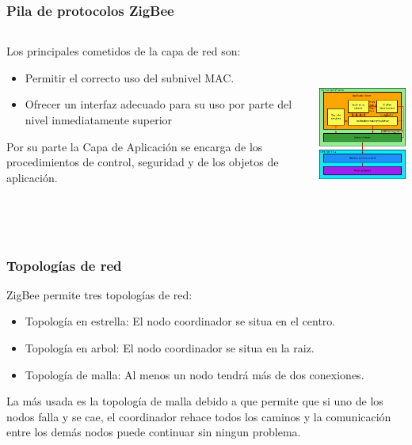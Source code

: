 \documentclass[10pt,a4paper,spanish]{beamer}
\begin{document}
\begin{frame}
	\frametitle{Pila de protocolos ZigBee}
	\begin{columns}
		\begin{column}{6cm}
			Los principales cometidos de la capa de red son:
			\begin{itemize}
				\item Permitir el correcto uso del subnivel MAC.
				\item Ofrecer un interfaz adecuado para su uso por parte del nivel inmediatamente superior
			\end{itemize}

			\vspace{0.5cm}
			Por su parte la Capa de Aplicación se encarga de los procedimientos de control, seguridad y de los objetos de aplicación.
		\end{column}
		\begin{column}{6cm}
			\begin{center}
				\includegraphics[height=6cm]{imagenes/2.png}
			\end{center}
		\end{column}
	\end{columns}
\end{frame}

\begin{frame}
	\frametitle{Topologías de red}
	ZigBee permite tres topologías de red:
	\begin{block}{}
		\begin{itemize}
			\item Topología en estrella: El nodo coordinador se situa en el centro.
			\item Topología en arbol: El nodo coordinador se situa en la raiz.
			\item Topología de malla: Al menos un nodo tendrá más de dos conexiones.
		\end{itemize}
	\end{block}

	\vspace{0.5cm}
	La más usada es la topología de malla debido a que permite que si uno de los nodos falla y se cae, el coordinador rehace todos los caminos y la comunicación entre los demás nodos puede continuar sin ningun problema.
\end{frame}
\end{document}
